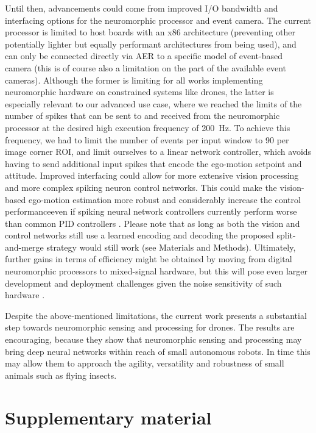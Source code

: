 Until then, advancements could come from improved I/O bandwidth and interfacing options for the neuromorphic processor and event camera. The current processor is limited to host boards with an x86 architecture (preventing other potentially lighter but equally performant architectures from being used), and can only be connected directly via AER to a specific model of event-based camera (this is of course also a limitation on the part of the available event cameras). Although the former is limiting for all works implementing neuromorphic hardware on constrained systems like drones, the latter is especially relevant to our advanced use case, where we reached the limits of the number of spikes that can be sent to and received from the neuromorphic processor at the desired high execution frequency of 200~Hz. To achieve this frequency, we had to limit the number of events per input window to 90 per image corner ROI, and limit ourselves to a linear network controller, which avoids having to send additional input spikes that encode the ego-motion setpoint and attitude. Improved interfacing could allow for more extensive vision processing and more complex spiking neuron control networks. This could make the vision-based ego-motion estimation more robust and considerably increase the control performance\textemdash even if spiking neural network controllers currently perform worse than common PID controllers \cite{stagsted2020eventbased,stroobants2022design}. Please note that as long as both the vision and control networks still use a learned encoding and decoding the proposed split-and-merge strategy would still work (see Materials and Methods). 
Ultimately, further gains in terms of efficiency might be obtained by moving from digital neuromorphic processors to mixed-signal hardware, but this will pose even larger development and deployment challenges given the noise sensitivity of such hardware \cite{sandamirskaya2022neuromorphic,frenkel2023bottomup}.

Despite the above-mentioned limitations, the current work presents a substantial step towards neuromorphic sensing and processing for drones. The results are encouraging, because they show that neuromorphic sensing and processing may bring deep neural networks within reach of small autonomous robots. In time this may allow them to approach the agility, versatility and robustness of small animals such as flying insects.

\section*{Supplementary material}
\vspace{10pt}

